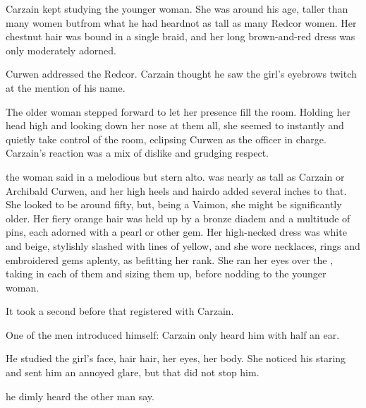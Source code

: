 Carzain kept studying the younger woman. 
She was around his age, taller than many women but\dash from what he had heard\dash not as tall as many Redcor women. 
Her chestnut hair was bound in a single braid, and her long brown-and-red dress was only moderately adorned. 

Curwen addressed the Redcor. 
Carzain thought he saw the girl's eyebrows twitch at the mention of his name. 

The older woman stepped forward to let her presence fill the room. 
Holding her head high and looking down her nose at them all, she seemed to instantly and quietly take control of the room, eclipsing Curwen as the officer in charge. 
Carzain's reaction was a mix of dislike and grudging respect. 

the woman said in a melodious but stern alto. 
\Mrs{} \Esmerel{} was nearly as tall as Carzain or Archibald Curwen, and her high heels and hairdo added several inches to that. 
She looked to be around fifty, but, being a Vaimon, she might be significantly older. 
Her fiery orange hair was held up by a bronze diadem and a multitude of pins, each adorned with a pearl or other gem. 
Her high-necked dress was white and beige, stylishly slashed with lines of yellow, and she wore necklaces, rings and embroidered gems aplenty, as befitting her rank. 
She ran her eyes over the \ishrah, taking in each of them and sizing them up, before nodding to the younger woman. 



It took a second before that registered with Carzain. 


One of the men introduced himself: 
Carzain only heard him with half an ear. 


He studied the girl's face, hair hair, her eyes, her body. 
She noticed his staring and sent him an annoyed glare, but that did not stop him. 

he dimly heard the other man say. 

